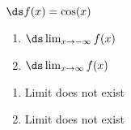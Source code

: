 {$\ds f(x) = \cos (x)$

\begin{enumerate}
\item		$\ds \lim_{x\to -\infty} f(x)$
\item		$\ds \lim_{x\to \infty} f(x)$
\end{enumerate}

}
{\begin{enumerate}
\item	Limit does not exist
\item	Limit does not exist
\end{enumerate}
}
